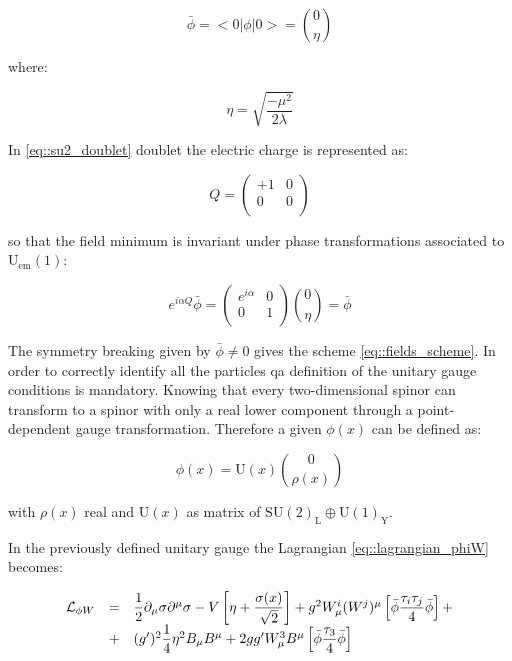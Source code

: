 \begin{equation}
 \bar{\phi}= < 0|\phi|0 > = \binom{0}{\eta}
 \label{eq::vacuum_expectation}
\end{equation}

where:

\begin{equation}
\eta = \sqrt{\dfrac{-\mu^{2}}{2\lambda}}
\label{eq::eta_value}
\end{equation}

In \autoref{eq::su2_doublet} doublet the electric charge is represented as:

\begin{equation}
Q = 
\begin{pmatrix}
+1 & 0 \\
0 & 0 \\
\end{pmatrix}
\end{equation}

so that the field minimum is invariant under phase transformations associated to $\text{U}_{\text{em}}(1)$:

\begin{equation}
e^{i\alpha Q} \bar{\phi} = 
\begin{pmatrix}
e^{i\alpha} & 0 \\
0 & 1 \\ 
\end{pmatrix}
\binom{0}{\eta}
= \bar{\phi}
\end{equation}

The symmetry breaking given by $\bar{\phi} \neq 0$ gives the scheme \ref{eq::fields_scheme}.
In order to correctly identify all the particles qa definition of the unitary gauge conditions is mandatory. Knowing that every two-dimensional spinor can transform to a spinor with only a real lower component through a point-dependent gauge transformation. Therefore a given $\phi(x)$
can be defined as:

\begin{equation}
\phi(x) = \text{U}(x) \binom{0}{\rho(x)}
\end{equation}

with $\rho(x)$ real and $\text{U}(x)$ as matrix of $ \text{SU}(2)_{\text{L}} \oplus \text{U}(1)_{\text{Y}}$. 

In the previously defined unitary gauge the Lagrangian \ref{eq::lagrangian_phiW} becomes:

\begin{equation}
\begin{array}{r c l}
\mathcal{L}_{\phi W}&=&\dfrac{1}{2} \partial_{\mu} \sigma \partial^{\mu} \sigma - V \left[ \eta + \dfrac{\sigma(x)}{\sqrt{2}}\right] + g^{2} W_{\mu}^{i}(W^{j})^{\mu} \left[ \bar{\phi} \dfrac{\tau_{i}\tau_{j}}{4}\bar{\phi}\right] +\\
&+&(g^{\prime})^{2} \dfrac{1}{4}\eta^{2} B_{\mu} B^{\mu} + 2 gg^{\prime} W^{3}_{\mu} B^{\mu} \left[ \bar{\phi} \dfrac{\tau_{3}}{4} \bar{\phi} \right]
\end{array}
\end{equation}

